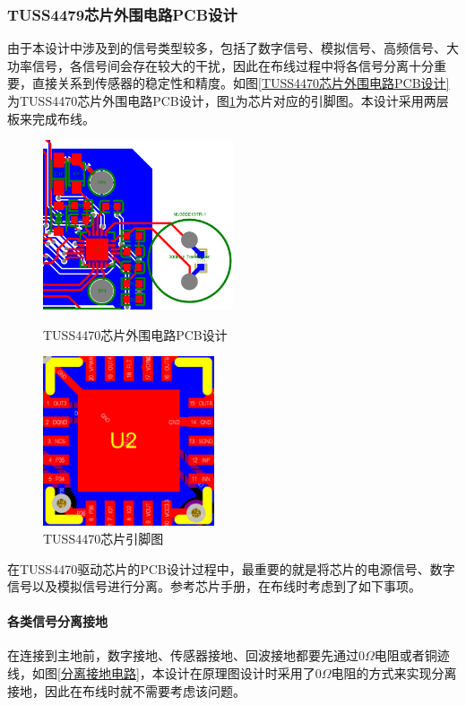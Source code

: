\subsubsection{TUSS4479芯片外围电路PCB设计}
由于本设计中涉及到的信号类型较多，包括了数字信号、模拟信号、高频信号、大功率信号，各信号间会存在较大的干扰，因此在布线过程中将各信号分离十分重要，直接关系到传感器的稳定性和精度。如图\ref{TUSS4470芯片外围电路PCB设计}为TUSS4470芯片外围电路PCB设计，图\ref{TUSS4470芯片引脚图}为芯片对应的引脚图。本设计采用两层板来完成布线。
\begin{figure}[!h]
	\begin{minipage}[t]{0.5\linewidth}
		\centering
		\includegraphics[height=5cm]{figure/TUSS4470 pcb.png}
		\caption{TUSS4470芯片外围电路PCB设计}
		\label{TUSS4470芯片外围电路PCB设计}
	\end{minipage}
	\begin{minipage}[t]{0.5\linewidth}
		\centering
		\includegraphics[height=5cm]{figure/TUSS4470 PIN.png}
		\caption{TUSS4470芯片引脚图}
		\label{TUSS4470芯片引脚图}
	\end{minipage}  		 
\end{figure}\par
在TUSS4470驱动芯片的PCB设计过程中，最重要的就是将芯片的电源信号、数字信号以及模拟信号进行分离。参考芯片手册，在布线时考虑到了如下事项。\par
\paragraph{各类信号分离接地}
在连接到主地前，数字接地、传感器接地、回波接地都要先通过0$\Omega$电阻或者铜迹线，如图\ref{分离接地电路}，本设计在原理图设计时采用了0$\Omega$电阻的方式来实现分离接地，因此在布线时就不需要考虑该问题。
